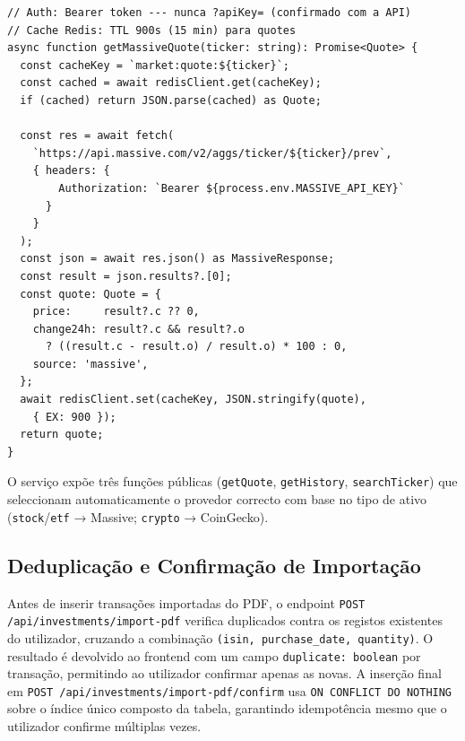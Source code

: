 \begin{lstlisting}[caption={Consulta de cotação via Massive API com cache Redis (marketDataService.ts).},label={lst:massive-api}]
// Auth: Bearer token --- nunca ?apiKey= (confirmado com a API)
// Cache Redis: TTL 900s (15 min) para quotes
async function getMassiveQuote(ticker: string): Promise<Quote> {
  const cacheKey = `market:quote:${ticker}`;
  const cached = await redisClient.get(cacheKey);
  if (cached) return JSON.parse(cached) as Quote;

  const res = await fetch(
    `https://api.massive.com/v2/aggs/ticker/${ticker}/prev`,
    { headers: {
        Authorization: `Bearer ${process.env.MASSIVE_API_KEY}`
      }
    }
  );
  const json = await res.json() as MassiveResponse;
  const result = json.results?.[0];
  const quote: Quote = {
    price:     result?.c ?? 0,
    change24h: result?.c && result?.o
      ? ((result.c - result.o) / result.o) * 100 : 0,
    source: 'massive',
  };
  await redisClient.set(cacheKey, JSON.stringify(quote),
    { EX: 900 });
  return quote;
}
\end{lstlisting}

O serviço expõe três funções públicas (\texttt{getQuote}, \texttt{getHistory}, \texttt{searchTicker}) que seleccionam automaticamente o provedor correcto com base no tipo de ativo (\texttt{stock}/\texttt{etf} → Massive; \texttt{crypto} → CoinGecko).

\subsection{Deduplicação e Confirmação de Importação}
\label{sec:impl-invest-dedup}

Antes de inserir transações importadas do PDF, o endpoint \texttt{POST /api/investments/import-pdf} verifica duplicados contra os registos existentes do utilizador, cruzando a combinação \texttt{(isin, purchase\_date, quantity)}. O resultado é devolvido ao frontend com um campo \texttt{duplicate: boolean} por transação, permitindo ao utilizador confirmar apenas as novas. A inserção final em \texttt{POST /api/investments/import-pdf/confirm} usa \texttt{ON CONFLICT DO NOTHING} sobre o índice único composto da tabela, garantindo idempotência mesmo que o utilizador confirme múltiplas vezes.

